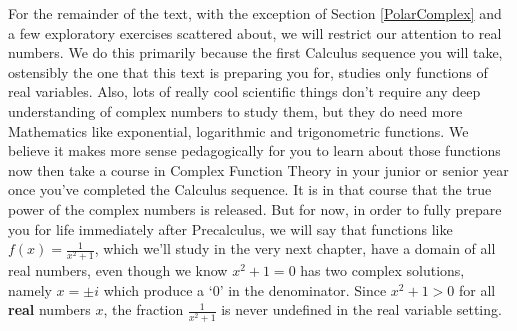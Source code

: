 \documentclass{ximera}
\begin{document}
  

For the remainder of the text, with the exception of Section \ref{PolarComplex} and a few exploratory exercises scattered about, we will restrict our attention to real numbers.  We do this primarily because the first Calculus sequence you will take, ostensibly the one that this text is preparing you for, studies only functions of real variables.  Also, lots of really cool scientific things don't require any deep understanding of complex numbers to study them, but they do need more Mathematics like exponential, logarithmic and trigonometric functions.  We believe it makes more sense pedagogically for you to learn about those functions now then take a course in Complex Function Theory in your junior or senior year once you've completed the Calculus sequence.  It is in that course that the true power of the complex numbers is released.  But for now, in order to fully prepare you for life immediately after Precalculus, we will say that functions like $f(x) = \frac{1}{x^{2} + 1}$, which we'll study in the very next chapter,  have a domain of all real numbers, even though we know $x^{2} + 1 = 0$ has two complex solutions, namely $x = \pm i$ which produce a `$0$' in the denominator.  Since $x^{2} + 1 > 0$ for all \textbf{real} numbers $x$, the fraction $\frac{1}{x^{2} + 1}$ is never undefined in the real variable setting.


\closegraphsfile
\end{document}
